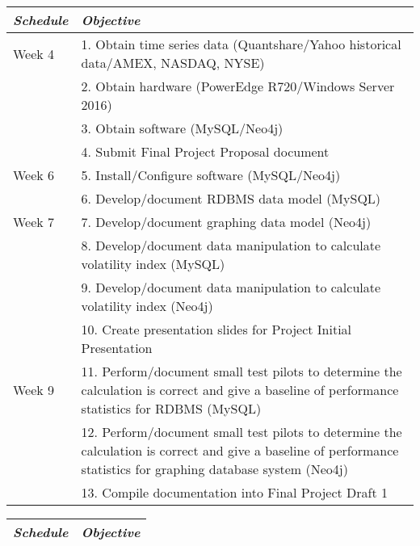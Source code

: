 \documentclass{IEEEtran}
\begin{document}
\begin{center}
\begin{tabularx}{0.5\textwidth}{|l|X|}
\hline
\textit{Schedule} & \textit{Objective} \\ \hline
Week 4 & 1. Obtain time series data (Quantshare/Yahoo historical data/AMEX, NASDAQ, NYSE) \\

& 2. Obtain hardware (PowerEdge R720/Windows Server 2016) \\

& 3. Obtain software (MySQL/Neo4j) \\

& 4. Submit Final Project Proposal document \\ \hline

Week 6 & 5. Install/Configure software (MySQL/Neo4j) \\

& 6. Develop/document RDBMS data model (MySQL) \\ \hline

Week 7 & 7. Develop/document graphing data model (Neo4j) \\

& 8. Develop/document data manipulation to calculate volatility index (MySQL) \\

& 9. Develop/document data manipulation to calculate volatility index (Neo4j) \\

& 10. Create presentation slides for Project Initial Presentation \\ \hline

Week 9 & 11. Perform/document small test pilots to determine the calculation is correct and give a baseline of performance statistics for RDBMS (MySQL) \\

& 12. Perform/document small test pilots to determine the calculation is correct and give a baseline of performance statistics for graphing database system (Neo4j) \\

& 13. Compile documentation into Final Project Draft 1 \\ \hline 


\end{tabularx}

\begin{tabularx}{0.5\textwidth}{|l|X|}
\hline
\textit{Schedule} & \textit{Objective} \\ \hline


\end{tabularx}
\end{center}
\end{document}
